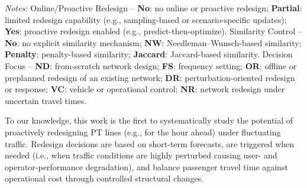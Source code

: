 \documentclass[a4paper,fleqn]{cas-sc}
\begin{document}
\begin{table}[pos=htbp]
\begin{threeparttable}
\vspace{2pt}
\parbox{\textwidth}{\footnotesize
\textit{Notes:} Online/Proactive Redesign -- \textbf{No}: no online or proactive redesign; \textbf{Partial}: limited redesign capability (e.g., sampling-based or scenario-specific updates); \textbf{Yes}: proactive redesign enabled (e.g., predict-then-optimize).
Similarity Control -- \textbf{No}: no explicit similarity mechanism; \textbf{NW}: Needleman--Wunsch-based similarity; \textbf{Penalty}: penalty-based similarity; \textbf{Jaccard}: Jaccard-based similarity.
Decision Focus -- \textbf{ND}: from-scratch network design; \textbf{FS}: frequency setting; \textbf{OR}: offline or preplanned redesign of an existing network; \textbf{DR}: perturbation-oriented redesign or response; \textbf{VC}: vehicle or operational control; \textbf{NR}: network redesign under uncertain travel times.
}

\caption{Comparative analysis of public transport optimization approaches across decision scope, online/proactive redesign capability, and similarity control mechanisms.}
\label{tab:innovation_matrix}
\end{threeparttable}
\end{table}


To our knowledge, this work is the first to systematically study the potential of proactively redesigning PT lines (e.g., for the hour ahead) under fluctuating traffic. Redesign decisions are based on short-term forecasts, are triggered when needed (i.e., when traffic conditions are highly perturbed causing user- and operator-performance degradation), and balance passenger travel time against operational cost through controlled structural changes.




\FloatBarrier
\end{document}
